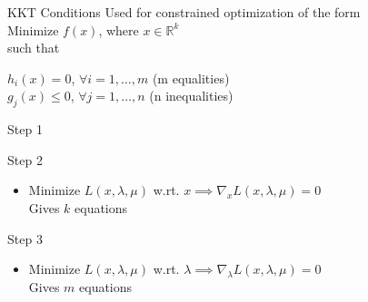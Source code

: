 \documentclass{beamer}
\begin{document}
\begin{frame}{KKT Conditions}
	Used for constrained optimization of the form\\
	\vspace{1cm}
	Minimize $f(x)$, where $x \in \mathbb{R}^k$\\
	such that\\
	\begin{center}
		$h_i(x) = 0$,  $\forall i = 1, \dots, m$ (m equalities)\\
		$g_j(x) \leq 0$,  $\forall j = 1, \dots, n$ (n inequalities)\\
	\end{center}
\end{frame}

\begin{frame}{Step 1}
	\begin{itemize}
	\end{itemize}
\end{frame}

\begin{frame}{Step 2}
	\begin{itemize}
		\item Minimize $L(x, \lambda, \mu)$ w.rt. $x \implies \nabla_xL(x, \lambda, \mu) = 0 $\\
		Gives $k$ equations
	\end{itemize}
\end{frame}

\begin{frame}{Step 3}
	\begin{itemize}
		\item Minimize $L(x, \lambda, \mu)$ w.rt. $\lambda \implies \nabla_\lambda L(x, \lambda, \mu) = 0 $\\
		Gives $m$ equations
	\end{itemize}
\end{frame}
\end{document}
